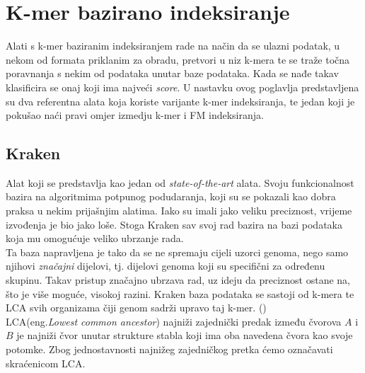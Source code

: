 \documentclass[times, utf8, seminar]{fer}
\begin{document}
\chapter{K-mer bazirano indeksiranje}
Alati s k-mer baziranim indeksiranjem rade na način da se ulazni podatak, u nekom od formata priklanim za obradu, pretvori u niz k-mera te se traže točna poravnanja s nekim od podataka unutar baze podataka. Kada se nađe takav klasificira se onaj koji ima najveći \textit{score}. U nastavku ovog poglavlja predstavljena su dva referentna alata koja koriste varijante k-mer indeksiranja, te jedan koji je pokušao naći pravi omjer izmedju k-mer i FM indeksiranja.
\section{Kraken}
Alat koji se predstavlja kao jedan od \textit{state-of-the-art} alata. Svoju funkcionalnost bazira na algoritmima potpunog podudaranja, koji su se pokazali kao dobra praksa u nekim prijašnjim alatima. Iako su imali jako veliku preciznost, vrijeme izvođenja je bio jako loše. Stoga Kraken sav svoj rad bazira na bazi podataka koja mu omogućuje veliko ubrzanje rada.
\\Ta baza napravljena je tako da se ne spremaju cijeli uzorci genoma, nego samo njihovi \textit{značajni} dijelovi, tj. dijelovi genoma koji su specifični za određenu skupinu. Takav pristup značajno ubrzava rad, uz ideju da preciznost ostane na, što je više moguće, visokoj razini. Kraken baza podataka se sastoji od k-mera te LCA svih organizama čiji genom sadrži upravo taj k-mer. (\cite{Kraken})
\\LCA(eng.\textit{Lowest common ancestor}) najniži zajednički predak između čvorova $A$ i $B$ je najniži čvor unutar strukture stabla koji ima oba navedena čvora kao svoje potomke. Zbog jednostavnosti najnižeg zajedničkog pretka ćemo označavati skraćenicom LCA.
\end{document}
